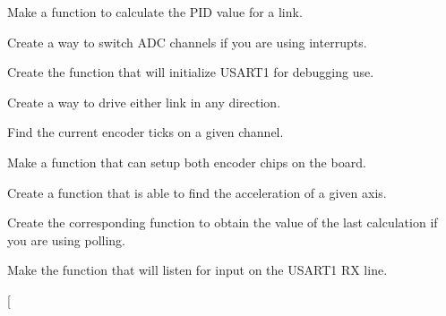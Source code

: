 
\begin{DoxyRefList}
\item[\label{todo__todo000017}%
\hypertarget{todo__todo000017}{}%
Global \hyperlink{_p_i_d_8h_a0b728f39f71526d44fd7cff0ce67319e}{calc\-P\-I\-D} (char link, int set\-Point, int act\-Pos)]Make a function to calculate the P\-I\-D value for a link.  
\item[\label{todo__todo000003}%
\hypertarget{todo__todo000003}{}%
Global \hyperlink{_a_d_c_8c_a8174ca24b578eaf4f82f44d6ce44edb0}{change\-A\-D\-C} (int channel)]Create a way to switch A\-D\-C channels if you are using interrupts.  
\item[\label{todo__todo000028}%
\hypertarget{todo__todo000028}{}%
Global \hyperlink{_u_s_a_r_t_debug_8c_a9a96eb5e6b5a13fff8ed69716e76a314}{debug\-U\-S\-A\-R\-T\-Init} (unsigned long baudrate)]Create the function that will initialize U\-S\-A\-R\-T1 for debugging use.  
\item[\label{todo__todo000008}%
\hypertarget{todo__todo000008}{}%
Global \hyperlink{motors_8h_af4a8cb121ce437984322ade3672082d2}{drive\-Link} (int link, int dir)]Create a way to drive either link in any direction.  
\item[\label{todo__todo000014}%
\hypertarget{todo__todo000014}{}%
Global \hyperlink{_periph_8h_a6c804bfcd9e9943d093395f535a3b672}{enc\-Count} (int chan)]Find the current encoder ticks on a given channel.  
\item[\label{todo__todo000012}%
\hypertarget{todo__todo000012}{}%
Global \hyperlink{_periph_8h_a15de8c2dd97f966ce278ab793669adfd}{enc\-Init} (int chan)]Make a function that can setup both encoder chips on the board.  
\item[\label{todo__todo000010}%
\hypertarget{todo__todo000010}{}%
Global \hyperlink{_periph_8h_a664961c139fdb66c6fd0fb0e997df433}{get\-Accel} (int axis)]Create a function that is able to find the acceleration of a given axis.  
\item[\label{todo__todo000002}%
\hypertarget{todo__todo000002}{}%
Global \hyperlink{_a_d_c_8c_a9f560657fb624f98de3161651f3d4385}{get\-A\-D\-C} (int channel)]Create the corresponding function to obtain the value of the last calculation if you are using polling.  
\item[\label{todo__todo000030}%
\hypertarget{todo__todo000030}{}%
Global \hyperlink{_u_s_a_r_t_debug_8c_a6653563b8e7c5134da2d944ff8ef2f73}{get\-Char\-Debug} ()]Make the function that will listen for input on the U\-S\-A\-R\-T1 R\-X line.  
\item[\label{todo__todo000030}%

\end{DoxyRefList}

